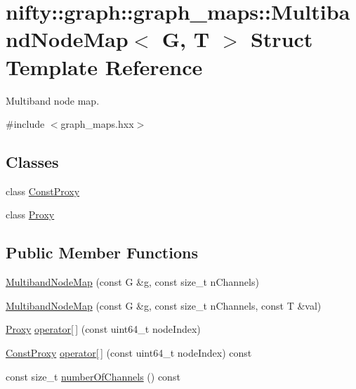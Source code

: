 \hypertarget{structnifty_1_1graph_1_1graph__maps_1_1MultibandNodeMap}{}\section{nifty\+:\+:graph\+:\+:graph\+\_\+maps\+:\+:Multiband\+Node\+Map$<$ G, T $>$ Struct Template Reference}
\label{structnifty_1_1graph_1_1graph__maps_1_1MultibandNodeMap}


Multiband node map.  




{\ttfamily \#include $<$graph\+\_\+maps.\+hxx$>$}

\subsection*{Classes}
\begin{DoxyCompactItemize}
\item 
class \hyperlink{classnifty_1_1graph_1_1graph__maps_1_1MultibandNodeMap_1_1ConstProxy}{Const\+Proxy}
\item 
class \hyperlink{classnifty_1_1graph_1_1graph__maps_1_1MultibandNodeMap_1_1Proxy}{Proxy}
\end{DoxyCompactItemize}
\subsection*{Public Member Functions}
\begin{DoxyCompactItemize}
\item 
\hyperlink{structnifty_1_1graph_1_1graph__maps_1_1MultibandNodeMap_ab532c7c22bab384004e75c21960f070f}{Multiband\+Node\+Map} (const G \&g, const size\+\_\+t n\+Channels)
\item 
\hyperlink{structnifty_1_1graph_1_1graph__maps_1_1MultibandNodeMap_ac5f3573ff6b06c219074426c2a66e0ef}{Multiband\+Node\+Map} (const G \&g, const size\+\_\+t n\+Channels, const T \&val)
\item 
\hyperlink{classnifty_1_1graph_1_1graph__maps_1_1MultibandNodeMap_1_1Proxy}{Proxy} \hyperlink{structnifty_1_1graph_1_1graph__maps_1_1MultibandNodeMap_a568a4290cfbdbf50e9c62e5f64d21a2a}{operator\mbox{[}$\,$\mbox{]}} (const uint64\+\_\+t node\+Index)
\item 
\hyperlink{classnifty_1_1graph_1_1graph__maps_1_1MultibandNodeMap_1_1ConstProxy}{Const\+Proxy} \hyperlink{structnifty_1_1graph_1_1graph__maps_1_1MultibandNodeMap_a882761915ba7197aed37e067dbc279f1}{operator\mbox{[}$\,$\mbox{]}} (const uint64\+\_\+t node\+Index) const
\item 
const size\+\_\+t \hyperlink{structnifty_1_1graph_1_1graph__maps_1_1MultibandNodeMap_a0d42faa5b57b203cf2e7206039d46ad8}{number\+Of\+Channels} () const
\end{DoxyCompactItemize}


